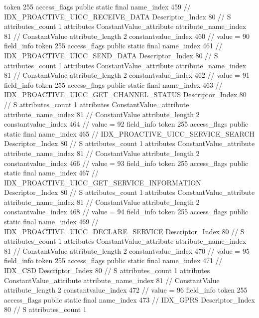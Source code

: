 {{{{{				token	255
				access_flags	public static final
				name_index	459		// IDX_PROACTIVE_UICC_RECEIVE_DATA
				Descriptor_Index	80		// S
				attributes_count	1
				attributes {
				ConstantValue_attribute {
					attribute_name_index	81		// ConstantValue
					attribute_length	2
					constantvalue_index	460		// value = 90
				}
				}
			}
			field_info {
				token	255
				access_flags	public static final
				name_index	461		// IDX_PROACTIVE_UICC_SEND_DATA
				Descriptor_Index	80		// S
				attributes_count	1
				attributes {
				ConstantValue_attribute {
					attribute_name_index	81		// ConstantValue
					attribute_length	2
					constantvalue_index	462		// value = 91
				}
				}
			}
			field_info {
				token	255
				access_flags	public static final
				name_index	463		// IDX_PROACTIVE_UICC_GET_CHANNEL_STATUS
				Descriptor_Index	80		// S
				attributes_count	1
				attributes {
				ConstantValue_attribute {
					attribute_name_index	81		// ConstantValue
					attribute_length	2
					constantvalue_index	464		// value = 92
				}
				}
			}
			field_info {
				token	255
				access_flags	public static final
				name_index	465		// IDX_PROACTIVE_UICC_SERVICE_SEARCH
				Descriptor_Index	80		// S
				attributes_count	1
				attributes {
				ConstantValue_attribute {
					attribute_name_index	81		// ConstantValue
					attribute_length	2
					constantvalue_index	466		// value = 93
				}
				}
			}
			field_info {
				token	255
				access_flags	public static final
				name_index	467		// IDX_PROACTIVE_UICC_GET_SERVICE_INFORMATION
				Descriptor_Index	80		// S
				attributes_count	1
				attributes {
				ConstantValue_attribute {
					attribute_name_index	81		// ConstantValue
					attribute_length	2
					constantvalue_index	468		// value = 94
				}
				}
			}
			field_info {
				token	255
				access_flags	public static final
				name_index	469		// IDX_PROACTIVE_UICC_DECLARE_SERVICE
				Descriptor_Index	80		// S
				attributes_count	1
				attributes {
				ConstantValue_attribute {
					attribute_name_index	81		// ConstantValue
					attribute_length	2
					constantvalue_index	470		// value = 95
				}
				}
			}
			field_info {
				token	255
				access_flags	public static final
				name_index	471		// IDX_CSD
				Descriptor_Index	80		// S
				attributes_count	1
				attributes {
				ConstantValue_attribute {
					attribute_name_index	81		// ConstantValue
					attribute_length	2
					constantvalue_index	472		// value = 96
				}
				}
			}
			field_info {
				token	255
				access_flags	public static final
				name_index	473		// IDX_GPRS
				Descriptor_Index	80		// S
				attributes_count	1
}}}}}
